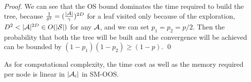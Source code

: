 {\begin{proof}
We can see that the OS bound dominates the time required to build the tree, because $\frac{1}{\delta^2}=(\frac{|\mathcal{A}|}{\gamma})^{2D}$ for a leaf visited only because of the exploration, $D^2 < |\mathcal{A}|^{2D} \in O(|\mathcal{S}|)$ for any $\mathcal{A}$, and we can set $p_1=p_2=p/2$. Then the probability that both the tree will be built and the convergence will be achieved can be bounded by $(1-p_1)(1-p_2) \geq (1-p)$. \qed
\end{proof}
As for computational complexity, the time cost as well as the memory required per node is linear in $|\mathcal{A}_i|$ in SM-OOS.

}

%
%

